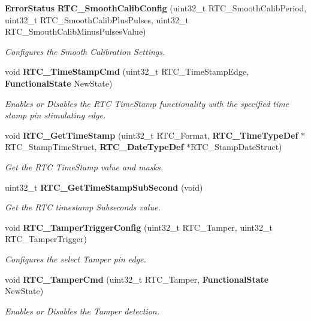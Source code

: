 \begin{DoxyCompactItemize}
\textbf{ Error\+Status} \textbf{ R\+T\+C\+\_\+\+Smooth\+Calib\+Config} (uint32\+\_\+t R\+T\+C\+\_\+\+Smooth\+Calib\+Period, uint32\+\_\+t R\+T\+C\+\_\+\+Smooth\+Calib\+Plus\+Pulses, uint32\+\_\+t R\+T\+C\+\_\+\+Smouth\+Calib\+Minus\+Pulses\+Value)
\begin{DoxyCompactList}\small\item\em Configures the Smooth Calibration Settings. \end{DoxyCompactList}\item 
void \textbf{ R\+T\+C\+\_\+\+Time\+Stamp\+Cmd} (uint32\+\_\+t R\+T\+C\+\_\+\+Time\+Stamp\+Edge, \textbf{ Functional\+State} New\+State)
\begin{DoxyCompactList}\small\item\em Enables or Disables the R\+TC Time\+Stamp functionality with the specified time stamp pin stimulating edge. \end{DoxyCompactList}\item 
void \textbf{ R\+T\+C\+\_\+\+Get\+Time\+Stamp} (uint32\+\_\+t R\+T\+C\+\_\+\+Format, \textbf{ R\+T\+C\+\_\+\+Time\+Type\+Def} $\ast$R\+T\+C\+\_\+\+Stamp\+Time\+Struct, \textbf{ R\+T\+C\+\_\+\+Date\+Type\+Def} $\ast$R\+T\+C\+\_\+\+Stamp\+Date\+Struct)
\begin{DoxyCompactList}\small\item\em Get the R\+TC Time\+Stamp value and masks. \end{DoxyCompactList}\item 
uint32\+\_\+t \textbf{ R\+T\+C\+\_\+\+Get\+Time\+Stamp\+Sub\+Second} (void)
\begin{DoxyCompactList}\small\item\em Get the R\+TC timestamp Subseconds value. \end{DoxyCompactList}\item 
void \textbf{ R\+T\+C\+\_\+\+Tamper\+Trigger\+Config} (uint32\+\_\+t R\+T\+C\+\_\+\+Tamper, uint32\+\_\+t R\+T\+C\+\_\+\+Tamper\+Trigger)
\begin{DoxyCompactList}\small\item\em Configures the select Tamper pin edge. \end{DoxyCompactList}\item 
void \textbf{ R\+T\+C\+\_\+\+Tamper\+Cmd} (uint32\+\_\+t R\+T\+C\+\_\+\+Tamper, \textbf{ Functional\+State} New\+State)
\begin{DoxyCompactList}\small\item\em Enables or Disables the Tamper detection. \end{DoxyCompactList}\item 

\end{DoxyCompactItemize}
